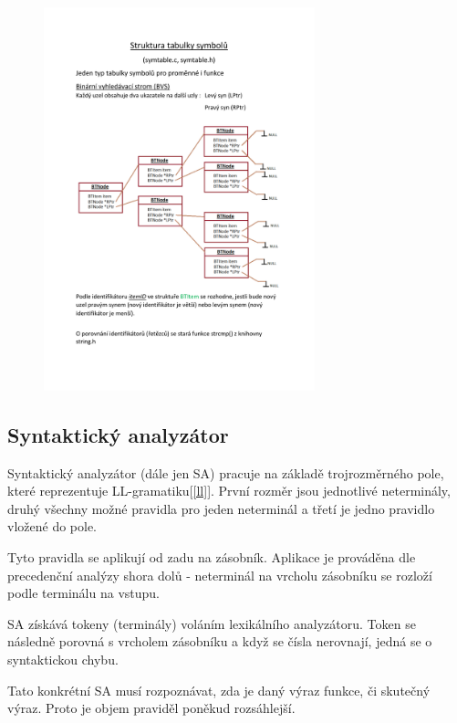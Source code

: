 \documentclass[11pt, a4paper]{article}
\begin{document}
	 \begin{figure} [h]
	\begin{center}
		\includegraphics[width=0.7\textwidth]{symtable}	
	\end{center}
		\end{figure}	
         

	\subsection{Syntaktický analyzátor}
	Syntaktický analyzátor (dále jen SA) pracuje na základě trojrozměrného pole, které reprezentuje LL-gramatiku[\ref{ll}]. První rozměr jsou jednotlivé neterminály, druhý všechny možné pravidla pro jeden neterminál a třetí je jedno pravidlo vložené do pole.
	
		Tyto pravidla se aplikují od zadu na zásobník. Aplikace je prováděna dle precedenční analýzy shora dolů - neterminál na vrcholu zásobníku se rozloží podle terminálu na vstupu. 
		
		SA získává tokeny (terminály) voláním lexikálního analyzátoru. Token se následně porovná s vrcholem zásobníku a když se čísla nerovnají, jedná se o syntaktickou chybu.
		
		Tato konkrétní SA musí rozpoznávat, zda je daný výraz funkce, či skutečný výraz. Proto je objem praviděl poněkud rozsáhlejší. 
		
\end{document}
